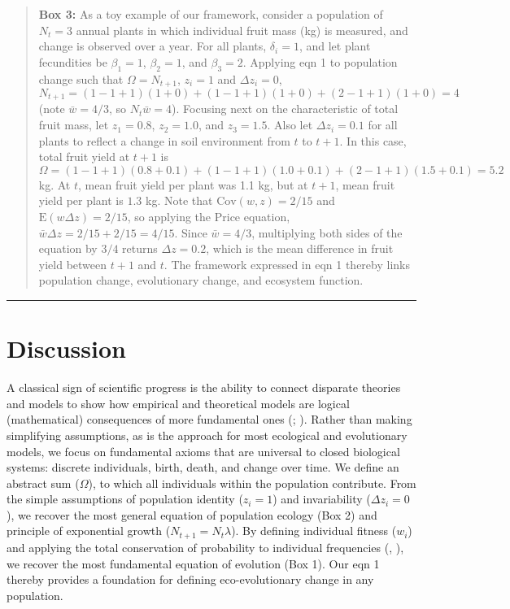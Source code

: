 \documentclass[
]{article}
\begin{document}
\begin{quote}
\textbf{Box 3:} As a toy example of our framework, consider a population
of \(N_{t} = 3\) annual plants in which individual fruit mass (kg) is
measured, and change is observed over a year. For all plants,
\(\delta_{i} = 1\), and let plant fecundities be \(\beta_{1} = 1\),
\(\beta_{2} = 1\), and \(\beta_{3} = 2\). Applying eqn 1 to population
change such that \(\Omega = N_{t+1}\), \(z_{i} = 1\) and
\(\Delta z_{i} = 0\),
\(N_{t+1} = (1 - 1 + 1)(1 + 0) + (1 - 1 + 1)(1 + 0) + (2 - 1 + 1)(1 + 0) = 4\)
(note \(\bar{w} = 4/3\), so \(N_{t}\bar{w} = 4\)). Focusing next on the
characteristic of total fruit mass, let \(z_{1} = 0.8\),
\(z_{2} = 1.0\), and \(z_{3} = 1.5\). Also let \(\Delta z_{i} = 0.1\)
for all plants to reflect a change in soil environment from \(t\) to
\(t + 1\). In this case, total fruit yield at \(t+1\) is
\(\Omega = (1 - 1 + 1)(0.8 + 0.1) + (1 - 1 + 1)(1.0 + 0.1) + (2 - 1 + 1)(1.5 + 0.1) = 5.2\)
kg. At \(t\), mean fruit yield per plant was 1.1 kg, but at \(t+1\),
mean fruit yield per plant is \(1.3\) kg. Note that
\(\mathrm{Cov}(w, z) = 2/15\) and \(\mathrm{E}(w \Delta z) = 2/15\), so
applying the Price equation, \(\bar{w}\Delta z = 2/15 + 2/15 = 4/15\).
Since \(\bar{w} = 4/3\), multiplying both sides of the equation by
\(3/4\) returns \(\Delta z = 0.2\), which is the mean difference in
fruit yield between \(t+1\) and \(t\). The framework expressed in eqn 1
thereby links population change, evolutionary change, and ecosystem
function.
\end{quote}

\begin{center}\rule{0.5\linewidth}{0.5pt}\end{center}

\section{Discussion}\label{discussion}

A classical sign of scientific progress is the ability to connect
disparate theories and models to show how empirical and theoretical
models are logical (mathematical) consequences of more fundamental ones
(;
). Rather than making
simplifying assumptions, as is the approach for most ecological and
evolutionary models, we focus on fundamental axioms that are universal
to closed biological systems: discrete individuals, birth, death, and
change over time. We define an abstract sum (\(\Omega\)), to which all
individuals within the population contribute. From the simple
assumptions of population identity (\(z_{i} = 1\)) and invariability
(\(\Delta z_{i} = 0\)), we recover the most general equation of
population ecology (Box 2) and principle of exponential growth
(\(N_{t+1} = N_{t}\lambda\)). By defining individual fitness (\(w_{i}\))
and applying the total conservation of probability to individual
frequencies (,
), we recover the most fundamental
equation of evolution (Box 1). Our eqn 1 thereby provides a foundation
for defining eco-evolutionary change in any population.
\end{document}
